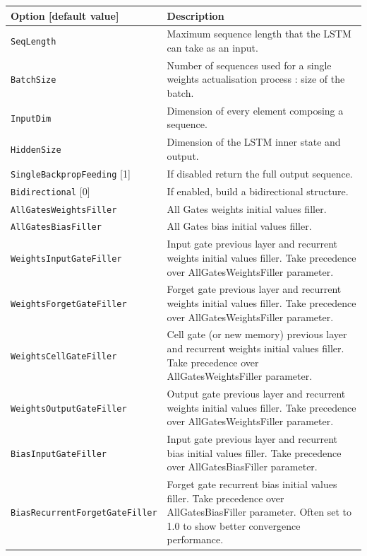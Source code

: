 \documentclass[a4paper,11pt,oneside]{article}
\begin{document}
\begin{center}
 \begin{longtable}{| p{5cm} | p{10cm} | }
 \hline
 Option [default value] & Description\\
 \hline\hline
  \cellcolor{requiredcolor}\lstinline!SeqLength! & Maximum sequence length that the LSTM can take as an input.\\
  \cellcolor{requiredcolor}\lstinline!BatchSize! & Number of sequences used for a single weights actualisation process : size of the batch. \\
  \cellcolor{requiredcolor}\lstinline!InputDim! & Dimension of every element composing a sequence. \\
  \cellcolor{requiredcolor}\lstinline!HiddenSize! & Dimension of the LSTM inner state and output.\\
  \lstinline!SingleBackpropFeeding! [1] & If disabled return the full output sequence.\\
  \lstinline!Bidirectional! [0] & If enabled, build a bidirectional structure.\\
  \lstinline!AllGatesWeightsFiller! & All Gates weights initial values filler.\\
  \lstinline!AllGatesBiasFiller! & All Gates bias initial values filler.\\
  \lstinline!WeightsInputGateFiller! & Input gate previous layer and recurrent weights initial values filler. Take precedence over AllGatesWeightsFiller parameter.\\
  \lstinline!WeightsForgetGateFiller! & Forget gate previous layer and recurrent weights initial values filler. Take precedence over AllGatesWeightsFiller parameter.\\
  \lstinline!WeightsCellGateFiller! & Cell gate (or new memory) previous layer and recurrent weights initial values filler. Take precedence over AllGatesWeightsFiller parameter.\\
  \lstinline!WeightsOutputGateFiller! & Output gate previous layer and recurrent weights initial values filler. Take precedence over AllGatesWeightsFiller parameter.\\
  \lstinline!BiasInputGateFiller! & Input gate previous layer and recurrent bias initial values filler. Take precedence over AllGatesBiasFiller parameter.\\
  \lstinline!BiasRecurrentForgetGateFiller! & Forget gate recurrent bias initial values filler. Take precedence over AllGatesBiasFiller parameter. Often set to 1.0 to show better convergence performance.\\

\end{longtable}
\end{center}
\end{document}
